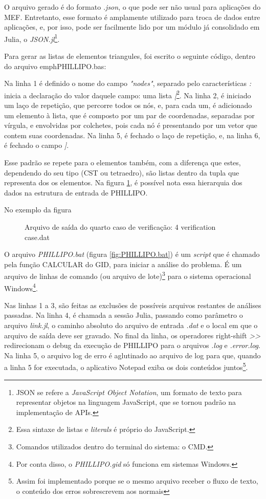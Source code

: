 O arquivo gerado é do formato \emph{.json}, o que pode ser não usual para aplicações do MEF. Entretanto, esse formato é amplamente utilizado para troca de dados entre aplicações, e, por isso, pode ser facilmente lido por um módulo já consolidado em Julia, o \emph{JSON.jl}\footnote{JSON se refere a \emph{JavaScript Object Notation}, um formato de texto para representar objetos na linguagem JavaScript, que se tornou padrão na implementação de APIs.}. 

Para gerar as listas de elementos triangules, foi escrito o seguinte código, dentro do arquivo emph{PHILLIPO.bas}:


Na linha 1 é definido o nome do campo \emph{"nodes"}, separado pelo características \emph{:} inicia a declaração do valor daquele campo: uma lista \emph{[}\footnote{Essa sintaxe de listas e \emph{literals} é próprio do JavaScript.}. Na linha 2, é iniciado um laço de repetição, que percorre todos os nós, e, para cada um, é adicionado um elemento à lista, que é composto por um par de coordenadas, separadas por vírgula, e envolvidas por colchetes, pois cada nó é presentando por um vetor que contem suas coordenadas. Na linha 5, é fechado o laço de repetição, e, na linha 6, é fechado o campo \emph{]}. 

Esse padrão se repete para o elementos também, com a diferença que estes, dependendo do seu tipo (CST ou tetraedro), são listas dentro da tupla que representa dos os elementos. Na figura \ref{fig:PHILLIPO.bas}, é possível nota essa hierarquia dos dados na estrutura de entrada de PHILLIPO.

No exemplo da figura

\begin{figure}[hbtp]
    \caption{Arquivo de saída do quarto caso de verificação: 4 verification case.dat}
    
    \label{fig:PHILLIPO.bas}
\end{figure}

O arquivo \emph{PHILLIPO.bat} (figura \ref{fig:PHILLIPO.bat}) é um \emph{script} que é chamado pela função CALCULAR do GID, para iniciar a análise do problema. É um arquivo de linhas de comando (ou arquivo de lote)\footnote{Comandos utilizados dentro do terminal do sistema: o CMD.} para o sistema operacional Windows\footnote{Por conta disso, o \emph{PHILLIPO.gid} só funciona em sistemas Windows.}.

Nas linhas 1 a 3, são feitas as exclusões de possíveis arquivos restantes de análises passadas. Na linha 4, é chamada a sessão Julia, passando como parâmetro o arquivo \emph{link.jl}, o caminho absoluto do arquivo de entrada \emph{.dat} e o local em que o arquivo de saída deve ser gravado. No final da linha, os operadores right-shift \emph{>>} redirecionam o debug da execução de PHILLIPO para o arquivos \emph{.log} e \emph{.error.log}. Na linha 5, o arquivo log de erro é aglutinado ao arquivo de log para que, quando a linha 5 for executada, o aplicativo Notepad exiba os dois conteúdos juntos\footnote{Assim foi implementado porque se o mesmo arquivo receber o fluxo de texto, o conteúdo dos erros sobrescrevem aos normais}. 

